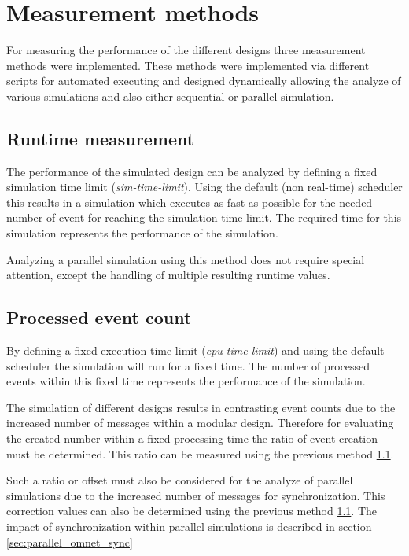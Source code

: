 \section{Measurement methods}
\label{sec:measurements_methods}
For measuring the performance of the different designs three measurement methods were implemented.
These methods were implemented via different scripts for automated executing and designed dynamically allowing the analyze of various simulations and also either sequential or parallel simulation.

\subsection{Runtime measurement}
\label{sec:measurements_methods_runtime}
The performance of the simulated design can be analyzed by defining a fixed simulation time limit (\emph{sim-time-limit}).
Using the default (non real-time) scheduler this results in a simulation which executes as fast as possible for the needed number of event for reaching the simulation time limit.
The required time for this simulation represents the performance of the simulation.

Analyzing a parallel simulation using this method does not require special attention, except the handling of multiple resulting runtime values.

\subsection{Processed event count}
\label{sec:measurements_methods_event}
By defining a fixed execution time limit (\emph{cpu-time-limit}) and using the default scheduler the simulation will run for a fixed time.
The number of processed events within this fixed time represents the performance of the simulation.

The simulation of different designs results in contrasting event counts due to the increased number of messages within a modular design.
Therefore for evaluating the created number within a fixed processing time the ratio of event creation must be determined.
This ratio can be measured using the previous method \ref{sec:measurements_methods_runtime}.

Such a ratio or offset must also be considered for the analyze of parallel simulations due to the increased number of messages for synchronization.
This correction values can also be determined using the previous method \ref{sec:measurements_methods_runtime}.
The impact of synchronization within parallel simulations is described in section \ref{sec:parallel_omnet_sync}

